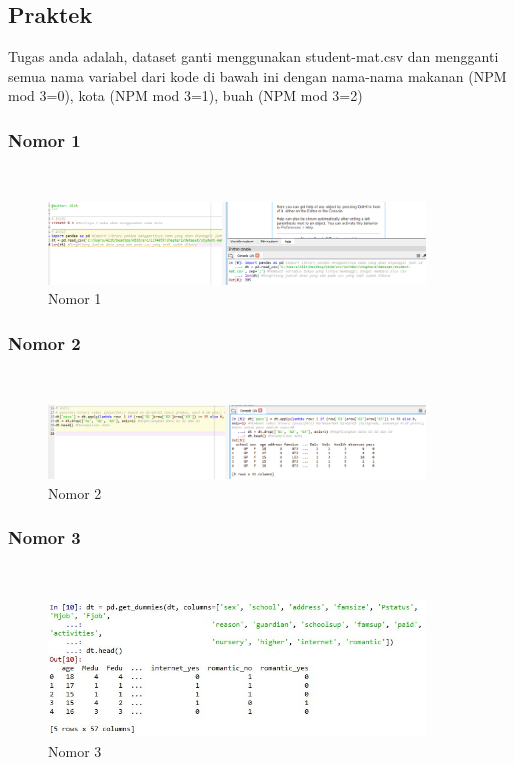 \subsection{Praktek}
Tugas anda adalah, dataset ganti menggunakan student-mat.csv dan mengganti semua nama variabel dari kode di bawah ini dengan nama-nama makanan (NPM mod 3=0), kota (NPM mod 3=1), buah (NPM mod 3=2)
 

\subsubsection{Nomor 1}
\hfill\\

\begin{figure}[H]
\centerline{\includegraphics[width=10cm]{figures/1174057/chapter2/11.png}}
\caption{Nomor 1}
\label{labelgambar}
\end{figure}

\subsubsection{Nomor 2}
\hfill\\

\begin{figure}[H]
\centerline{\includegraphics[width=10cm]{figures/1174057/chapter2/12.png}}
\caption{Nomor 2}
\label{labelgambar}
\end{figure}

\subsubsection{Nomor 3}
\hfill\\

\begin{figure}[H]
\centerline{\includegraphics[width=10cm]{figures/1174057/chapter2/13.jpg}}
\caption{Nomor 3}
\label{labelgambar}
\end{figure}

